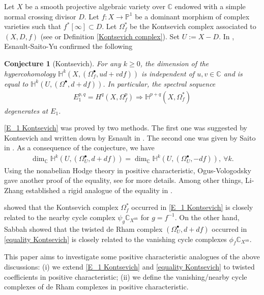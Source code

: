 \documentclass[12pt, a4paper]{article}
\newtheorem{conjecture}{Conjecture}[section]
\begin{document}
\iffalse
Let $X$ be a smooth projective algebraic variety over $\mathbb C$ endowed with a simple normal crossing divisor $D$. Let $f:X\to\mathbb P^1$ be a dominant  morphism of complex varieties such that $f^*[\infty]\subset D$. Let $\Omega^*_f$ be the Kontsevich complex associated to $(X,D,f)$ (see \cite[(1.3.1)]{ESY} or Definition \ref{Kontsevich complex}). Set $U:=X-D$. In \cite{ESY}, Esnault-Saito-Yu confirmed the following
\begin{conjecture}[Kontsevich]
For any $k\geq0$, the dimension of 
the hypercohomology $\mathbb H^k(X,(\Omega^\bullet_f,ud+vdf))$ is independent of $u,v\in\mathbb C$ and is equal to $\mathbb H^k(U,(\Omega^\bullet,d+df))$. In particular, the spectral sequence 
\begin{eqnarray}\label{E_1 Kontsevich}
E_1^{p,q}=H^q(X,\Omega^p_f)\Rightarrow\mathbb H^{p+q}(X,\Omega^*_f)
\end{eqnarray}
degenerates at $E_1$.
\end{conjecture}
\eqref{E_1 Kontsevich} was proved by two methods. The first one was suggested by Kontsevich and written down by Esnault in \cite[Appendix D]{ESY}. The second one was given by Saito in \cite[Appendix D]{ESY}. 
As a consequence of the conjecture, we have
\begin{eqnarray}\label{equality Kontsevich}
\dim_\mathbb C\mathbb H^k(U,(\Omega_U^\bullet,d+df))=\dim_\mathbb C\mathbb H^k(U,(\Omega_U^\bullet,-df)),~\forall k.
\end{eqnarray}
Using the nonabelian Hodge theory in positive characteristic, Ogus-Vologodsky gave another proof of the equality, see \cite[\S 4.7]{OV} for more details. Among other things, Li-Zhang established a rigid analogue of the equality in \cite{LZ}.

\cite[Appendix E]{ESY} showed that the Kontsevich complex $\Omega^*_f$ occurred in \eqref{E_1 Kontsevich}  is closely related to the nearby cycle complex $\psi_g\mathbb C_{X^\mathrm{an}}$ for $g=f^{-1}$. On the other hand, Sabbah \cite{Sah1} showed that the twisted de Rham complex $(\Omega^\bullet_U,d+df)$ occurred in \eqref{equality Kontsevich} is closely related to the vanishing cycle complexes $\phi_f\mathbb C_{X^\mathrm{an}}$.

This paper aims to investigate some positive characteristic analogues of the above discussions: (i) we extend \eqref{E_1 Kontsevich} and \eqref{equality Kontsevich} to twisted coefficients in positive characteristic; (ii) we define the vanishing/nearby cycle complexes of de Rham complexes in positive characteristic. 
\end{document}
